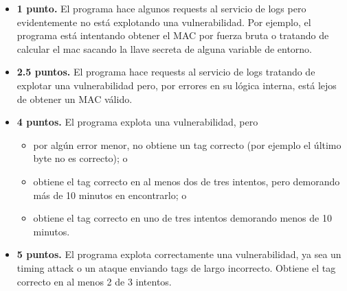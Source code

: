 \begin{itemize}
	\item[]\textbf{1 punto.} El programa hace algunos requests al servicio de logs pero evidentemente no está explotando una vulnerabilidad. Por ejemplo, el programa está intentando obtener el MAC por fuerza bruta o tratando de calcular el mac sacando la llave secreta de alguna variable de entorno.
	\item[]\textbf{2.5 puntos.} El programa hace requests al servicio de logs tratando de explotar una vulnerabilidad pero, por errores en su lógica interna, está lejos de obtener un MAC válido.
	\item[]\textbf{4 puntos.} El programa explota una vulnerabilidad, pero
		\begin{itemize}
			\item por algún error menor, no obtiene un tag correcto (por ejemplo el último byte no es correcto); o
			\item obtiene el tag correcto en al menos dos de tres intentos, pero demorando más de 10 minutos en encontrarlo; o
			\item obtiene el tag correcto en uno de tres intentos demorando menos de 10 minutos.
		\end{itemize}
	\item[]\textbf{5 puntos.} El programa explota correctamente una vulnerabilidad, ya sea un timing attack o un ataque enviando tags de largo incorrecto. Obtiene el tag correcto en al menos 2 de 3 intentos.
\end{itemize}
